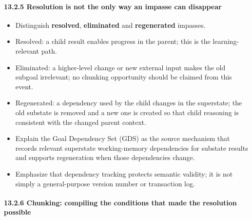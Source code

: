 \paragraph{13.2.5 Resolution is not the only way an impasse can disappear}\label{1325-resolution-is-not-the-only-way-an-impasse-can-disappear}

\begin{itemize}
\tightlist
\item
  Distinguish \textbf{resolved}, \textbf{eliminated} and \textbf{regenerated} impasses.
\item
  Resolved: a child result enables progress in the parent; this is the learning-relevant path.
\item
  Eliminated: a higher-level change or new external input makes the old subgoal irrelevant; no chunking opportunity should be claimed from this event.
\item
  Regenerated: a dependency used by the child changes in the superstate; the old substate is removed and a new one is created so that child reasoning is consistent with the changed parent context.
\item
  Explain the Goal Dependency Set (GDS) as the source mechanism that records relevant superstate working-memory dependencies for substate results and supports regeneration when those dependencies change.
\item
  Emphasize that dependency tracking protects semantic validity; it is not simply a general-purpose version number or transaction log.
\end{itemize}

\paragraph{13.2.6 Chunking: compiling the conditions that made the resolution possible}\label{1326-chunking-compiling-the-conditions-that-made-the-resolution-possible}

